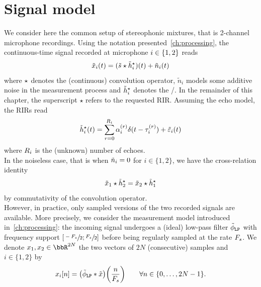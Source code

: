 \section{Signal model}
We consider here the common setup of stereophonic mixtures, that is 2-channel microphone recordings.
Using the notation presented~\cref{ch:processing}, the continuous-time signal recorded at microphone $i\in\{1,2\}$ reads
\begin{equation}
    \label{eq:blaster:recordedSignal}
    \tilde{x}_i(t) = (\tilde{s} \star \tilde{h}_i^\star)(t) + \tilde{n}_i(t)
\end{equation}
where $\star$ denotes the (continuous) convolution operator, $\tilde{n}_i$ models some additive noise in the measurement process and $\tilde{h}_i^\star$ denotes the \RIRdef/.
In the remainder of this chapter, the superscript $\star$ refers to the requested \ac{RIR}.
Assuming the echo model, the \acp{RIR} read
\begin{equation}
    \label{eq:blaster:def_filter_star}
    \tilde{h}_i^\star(t) = \sum_{r=0}^{R_i} \alpha_i^{(r)} \delta(t - \tau_i^{(r)}) + \tilde{\varepsilon}_i(t)
\end{equation}
where $R_i$ is the (unknown) number of echoes.
\\In the noiseless case, that is when $\tilde{n}_i = 0$ for $i\in\{1,2\}$, we have the cross-relation identity
\begin{equation} \label{eq:blaster:cross-relation}
    \tilde{x}_1 \star \tilde{h}_2^\star = \tilde{x}_2 \star \tilde{h}_1^\star
\end{equation}
by commutativity of the convolution operator.
\\However, in practice, only sampled versions of the two recorded signals are available.
More precisely, we consider the measurement model introduced in~\cref{ch:processing}:
the incoming signal undergoes a (ideal) low-pass filter $\lowpassfilter$ with frequency support $\kintervcc{\sfrac{-\Fs}{2}}{\sfrac{\Fs}{2}}$ before being regularly sampled at the rate $F_s$.
We denote $\disRecordedSignal_1,\disRecordedSignal_2\in\bbR^{2N}$ the two vectors of $2N$ (consecutive) samples and $i\in\{1, 2\}$ by
\begin{equation}
    \label{eq:blaster:measurement-process}
    \disRecordedSignal_i[n] =
    \kparen{\idealLowPassFilter \convDis \contRecordedSignal}\kparen{\frac{n}{\Fs}}
    \qquad
    \forall n \in\{0, \dots, 2N-1\}
    .
\end{equation}

